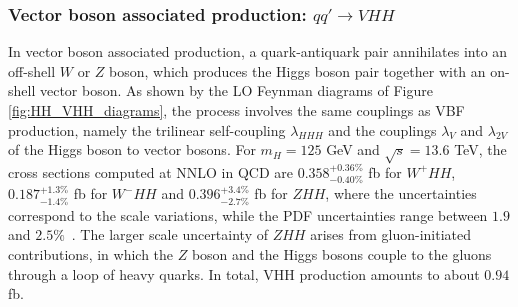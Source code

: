 \subsubsection{Vector boson associated production: $qq'\rightarrow VHH$}
% 
In vector boson associated production, a quark-antiquark pair annihilates into an off-shell $W$ or $Z$ boson, which produces the Higgs boson pair together with an on-shell vector boson. As shown by the LO Feynman diagrams of Figure \ref{fig:HH_VHH_diagrams}, the process involves the same couplings as VBF production, namely the trilinear self-coupling $\lambda_{HHH}$ and the couplings $\lambda_V$ and $\lambda_{2V}$ of the Higgs boson to vector bosons. For $m_H = 125$ GeV and $\sqrt{s} = 13.6$ TeV, the cross sections computed at NNLO in QCD are $0.358^{+0.36\%}_{-0.40\%}$ fb for $W^+HH$, $0.187^{+1.3\%}_{-1.4\%}$ fb for $W^-HH$ and $0.396^{+3.4\%}_{-2.7\%}$ fb for $ZHH$, where the uncertainties correspond to the scale variations, while the PDF uncertainties range between $1.9$ and $2.5\%$~\cite{Grober:2026ece,Baglio:2012np}. The larger scale uncertainty of $ZHH$ arises from gluon-initiated contributions, in which the $Z$ boson and the Higgs bosons couple to the gluons through a loop of heavy quarks. In total, VHH production amounts to about $0.94$ fb.
%
